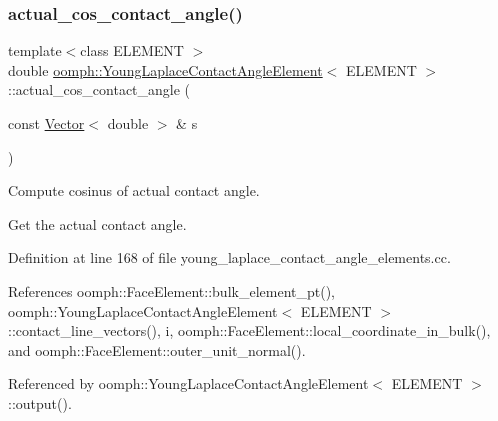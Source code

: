 \subsubsection{\texorpdfstring{actual\+\_\+cos\+\_\+contact\+\_\+angle()}{actual\_cos\_contact\_angle()}}
{\footnotesize\ttfamily template$<$class E\+L\+E\+M\+E\+NT $>$ \\
double \hyperlink{classoomph_1_1YoungLaplaceContactAngleElement}{oomph\+::\+Young\+Laplace\+Contact\+Angle\+Element}$<$ E\+L\+E\+M\+E\+NT $>$\+::actual\+\_\+cos\+\_\+contact\+\_\+angle (\begin{DoxyParamCaption}\item[{const \hyperlink{classoomph_1_1Vector}{Vector}$<$ double $>$ \&}]{s }\end{DoxyParamCaption})}



Compute cosinus of actual contact angle. 

Get the actual contact angle. 

Definition at line 168 of file young\+\_\+laplace\+\_\+contact\+\_\+angle\+\_\+elements.\+cc.



References oomph\+::\+Face\+Element\+::bulk\+\_\+element\+\_\+pt(), oomph\+::\+Young\+Laplace\+Contact\+Angle\+Element$<$ E\+L\+E\+M\+E\+N\+T $>$\+::contact\+\_\+line\+\_\+vectors(), i, oomph\+::\+Face\+Element\+::local\+\_\+coordinate\+\_\+in\+\_\+bulk(), and oomph\+::\+Face\+Element\+::outer\+\_\+unit\+\_\+normal().



Referenced by oomph\+::\+Young\+Laplace\+Contact\+Angle\+Element$<$ E\+L\+E\+M\+E\+N\+T $>$\+::output().

\mbox{\label{classoomph_1_1YoungLaplaceContactAngleElement_acfe3c702386c20a1f769be260cccb9d2}} 
